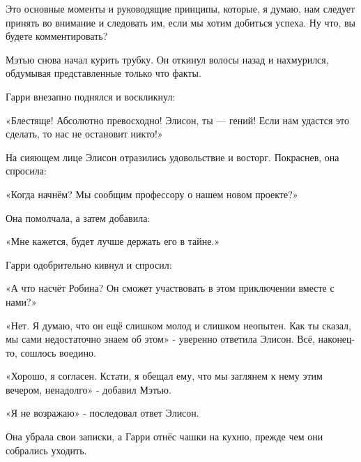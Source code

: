 \documentclass[a4paper,12pt]{book}
\begin{document}
\par
Это основные моменты и руководящие принципы, которые, я думаю, нам следует принять во внимание и следовать им, если мы хотим добиться успеха. Ну что, вы будете комментировать?\\
\par
Мэтью снова начал курить трубку. Он откинул волосы назад и нахмурился, обдумывая представленные только что факты.\\
\par
Гарри внезапно поднялся и воскликнул:
\par
«Блестяще! Абсолютно превосходно! Элисон, ты — гений! Если нам удастся это сделать, то нас не остановит никто!»
\par
На сияющем лице Элисон отразились удовольствие и восторг. Покраснев, она спросила:
\par
«Когда начнём? Мы сообщим профессору о нашем новом проекте?»
\par
Она помолчала, а затем добавила:
\par
«Мне кажется, будет лучше держать его в тайне.»
\par
Гарри одобрительно кивнул и спросил:
\par
«А что насчёт Робина? Он сможет участвовать в этом приключении вместе с нами?»
\par
«Нет. Я думаю, что он ещё слишком молод и слишком неопытен. Как ты сказал, мы сами недостаточно знаем об этом» - уверенно ответила Элисон. Всё, наконец-то, сошлось воедино.
\par
«Хорошо, я согласен. Кстати, я обещал ему, что мы заглянем к нему этим вечером, ненадолго» - добавил Мэтью.
\par
«Я не возражаю» - последовал ответ Элисон.\\
\par
Она убрала свои записки, а Гарри отнёс чашки на кухню, прежде чем они собрались уходить.
\end{document}

